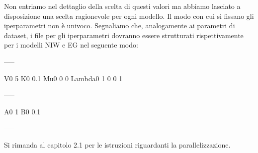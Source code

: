 \documentclass[a4paper,12pt]{report}							%
\begin{document}
Non entriamo nel dettaglio della scelta di questi valori ma abbiamo lasciato a disposizione una scelta ragionevole per ogni
modello. Il modo con cui si fissano gli iperparametri non è univoco. 
Segnaliamo che, analogamente ai parametri di dataset, i file per gli iperparametri dovranno essere strutturati 
rispettivamente per i modelli NIW e EG nel seguente modo:
\begin{center}
 -----
\end{center}
\begin{code}
V0
5
K0
0.1
Mu0
0
0
Lambda0
1 0
0 1
\end{code}
\begin{center}
 -----
\end{center}
\begin{code}
A0
1
B0
0.1
\end{code}
\begin{center}
 -----
\end{center}
Si rimanda al capitolo 2.1 per le istruzioni riguardanti la
parallelizzazione.
\end{document}
